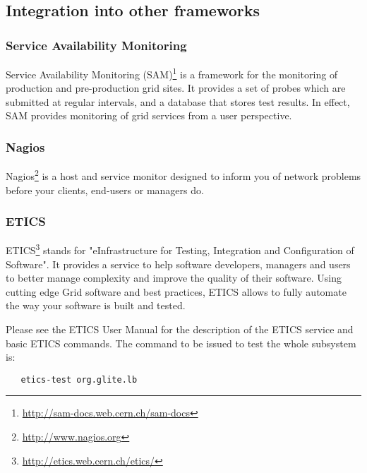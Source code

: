 \subsection{Integration into other frameworks}

\subsubsection{Service Availability Monitoring}

Service Availability Monitoring
(SAM)\footnote{\url{http://sam-docs.web.cern.ch/sam-docs}} is a framework for
the monitoring of production and pre-production grid sites. It provides a set
of probes which are submitted at regular intervals, and a database that stores
test results. In effect, SAM provides monitoring of grid services from a user
perspective. 



\subsubsection{Nagios} 

Nagios\footnote{\url{http://www.nagios.org}} is a host and service monitor
designed to inform you of network problems before your clients, end-users or
managers do.



\subsubsection{ETICS}

ETICS\footnote{\url{http://etics.web.cern.ch/etics/}} stands for
"eInfrastructure for Testing, Integration and Configuration of Software". It
provides a service to help software developers, managers and users to better
manage complexity and improve the quality of their software. Using cutting
edge Grid software and best practices, ETICS allows to fully automate
the way your software is built and tested.

Please see the ETICS User Manual \cite{etics_manual} for the description
of the ETICS service and basic ETICS commands. The command to be issued to 
test the whole \LB subsystem is:

\begin{verbatim}
   etics-test org.glite.lb
\end{verbatim}

